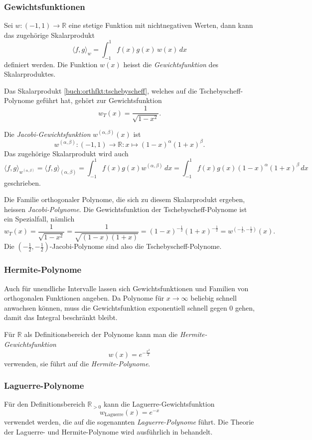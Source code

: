 %
%
\subsubsection{Gewichtsfunktionen}
Sei $w\colon(-1,1)\to \mathbb{R}$ eine stetige Funktion mit
nichtnegativen Werten, dann kann das zugehörige Skalarprodukt
\[
\langle f,g\rangle_w
=
\int_{-1}^1 f(x)g(x)\,w(x)\,dx
\]
definiert werden.
Die Funktion $w(x)$ heisst die {\em Gewichtsfunktion} des
Skalarproduktes.
%

Das Skalarprodukt 
\eqref{buch:orthfkt:tschebyscheff},
welches auf die Tschebyscheff-Polynome geführt hat, gehört zur 
Gewichtsfunktion
\[
w_T(x)
= 
\frac{1}{\!\sqrt{1-x^2}}.
\]

\begin{definition}
Die {\em Jacobi-Gewichtsfunktion} $w^{(\alpha,\beta)}(x)$ ist 
\[
w^{(\alpha,\beta)}
\colon
(-1,1) \to \mathbb{R}
:
x\mapsto (1-x)^\alpha(1+x)^\beta.
\]
Das zugehörige Skalarprodukt wird auch
\[
\langle f,g\rangle_{w^{(\alpha,\beta)}}
=
\langle f,g\rangle_{(\alpha,\beta)}
=
\int_{-1}^1 f(x)g(x) w^{(\alpha,\beta)}\,dx
=
\int_{-1}^1 f(x)g(x) (1-x)^\alpha(1+x)^\beta\,dx
\]
geschrieben.
\end{definition}

Die Familie orthogonaler Polynome, die sich zu diesem Skalarprodukt
ergeben, heissen {\em Jacobi-Polynome}.
%
Die Gewichtsfunktion der Tschebyscheff-Polynome ist ein Spezialfall,
nämlich
\[
w_T(x)
=
\frac{1}{\!\sqrt{1-x^2}}
=
\frac{1}{\!\sqrt{(1-x)(1+x)}}
=
(1-x)^{-\frac12}(1+x)^{-\frac12}
=
w^{(-\frac12,-\frac12)}(x).
\]
Die $(-\frac12,-\frac12)$-Jacobi-Polynome sind also die
Tschebyscheff-Polynome.

%
%
\subsubsection{Hermite-Polynome}
Auch für unendliche Intervalle lassen sich Gewichtsfunktionen und
Familien von orthogonalen Funktionen angeben.
Da Polynome für $x\to\infty$ beliebig schnell anwachsen können,
muss die Gewichtsfunktion exponentiell schnell gegen $0$ gehen, damit
das Integral beschränkt bleibt.

Für $\mathbb{R}$ als Definitionsbereich der Polynome kann man die
{\em Hermite-Gewichtsfunktion}
%
\[
w(x) = e^{-\frac{x^2}2}
\]
verwenden, sie führt auf die {\em Hermite-Polynome}.
%

%
%
\subsubsection{Laguerre-Polynome}
Für den Definitionsbereich $\mathbb{R}_{>0}$ kann die
Laguerre-Gewichtsfunktion
\[
w_{\text{Laguerre}}(x)
=
e^{-x}
\]
verwendet werden, die auf die sogenannten {\em Laguerre-Polynome}
führt.
Die Theorie der Laguerre- und Hermite-Polynome wird ausführlich
in \cite{buch:mathsem-spezfunk} behandelt.

